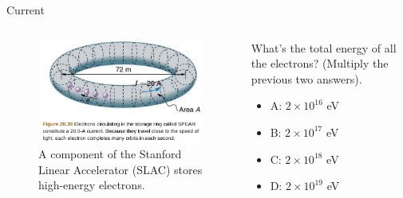\documentclass{beamer}
\begin{document}
\begin{frame}{Current}
\begin{columns}[T]
\begin{column}{0.5\textwidth}
\begin{figure}
\centering
\includegraphics[width=\textwidth]{figures/SPEAR.png}
\caption{\label{fig:SLAC} A component of the Stanford Linear Accelerator (SLAC) stores high-energy electrons.}
\end{figure}
\end{column}
\begin{column}{0.5\textwidth}
\small
What's the total energy of all the electrons?  (Multiply the previous two answers).
\begin{itemize}
\item A: $2 \times 10^{16}$ eV
\item B: $2 \times 10^{17}$ eV
\item C: $2 \times 10^{18}$ eV
\item D: $2 \times 10^{19}$ eV
\end{itemize}
\end{column}
\end{columns}
\end{frame}
\end{document}
